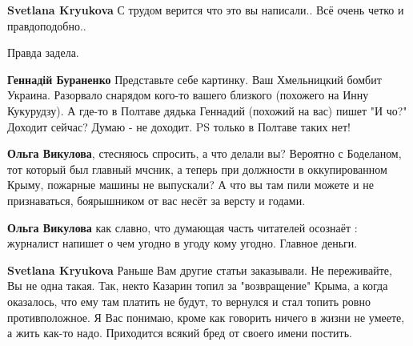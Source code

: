 \begin{itemize}
\begin{itemize}
\textbf{Svetlana Kryukova} С трудом верится что это вы написали.. Всё очень четко и правдоподобно..

 
Правда задела.

 
\textbf{Геннадій Бураненко} Представьте себе картинку.
Ваш Хмельницкий бомбит Украина. Разорвало снарядом кого-то вашего близкого (похожего на Инну Кукурудзу).
А где-то в Полтаве дядька Геннадий (похожий на вас) пишет "И чо?"
Доходит сейчас?
Думаю - не доходит.
PS только в Полтаве таких нет!

 
\textbf{Ольга Викулова}, стесняюсь спросить, а что делали вы? Вероятно с Боделаном, тот который был главный мчсник, а теперь при должности в оккупированном Крыму, пожарные машины не выпускали? А что вы там пили можете и не признаваться, боярышником от вас несёт за версту и годами.

 
\textbf{Ольга Викулова} как славно, что думающая часть читателей осознаёт : журналист напишет о чем угодно в угоду кому угодно. Главное деньги.

 
\textbf{Svetlana Kryukova} Раньше Вам другие статьи заказывали. Не переживайте, Вы не одна такая. Так, некто Казарин топил за "возвращение" Крыма, а когда оказалось, что ему там платить не будут, то вернулся и стал топить ровно противположное. Я Вас понимаю, кроме как говорить ничего в жизни не умеете, а жить как-то надо. Приходится всякий бред от своего имени постить.


\end{itemize}
\end{itemize}
